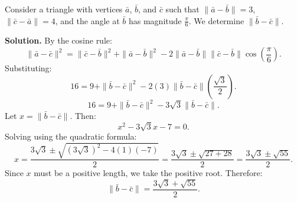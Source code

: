 \begin{examplebox}
Consider a triangle with vertices $\bar{a}$, $\bar{b}$, and $\bar{c}$ such that $\|\bar{a} - \bar{b}\| = 3$, $\|\bar{c} - \bar{a}\| = 4$, and the angle at $\bar{b}$ has magnitude $\frac{\pi}{6}$. We determine $\|\bar{b} - \bar{c}\|$.

\vspace{0.5em}
\textbf{Solution.} By the cosine rule:
\[
\|\bar{a} - \bar{c}\|^2 = \|\bar{c} - \bar{b}\|^2 + \|\bar{a} - \bar{b}\|^2 - 2\|\bar{a} - \bar{b}\|\|\bar{c} - \bar{b}\|\cos\left(\frac{\pi}{6}\right).
\]
Substituting:
\[
16 = 9 + \|\bar{b} - \bar{c}\|^2 - 2(3)\|\bar{b} - \bar{c}\|\left(\frac{\sqrt{3}}{2}\right).
\]
\[
16 = 9 + \|\bar{b} - \bar{c}\|^2 - 3\sqrt{3}\|\bar{b} - \bar{c}\|.
\]
Let $x = \|\bar{b} - \bar{c}\|$. Then:
\[
x^2 - 3\sqrt{3}x - 7 = 0.
\]
Solving using the quadratic formula:
\[
x = \frac{3\sqrt{3} \pm \sqrt{(3\sqrt{3})^2 - 4(1)(-7)}}{2} = \frac{3\sqrt{3} \pm \sqrt{27+28}}{2} = \frac{3\sqrt{3} \pm \sqrt{55}}{2}.
\]
Since $x$ must be a positive length, we take the positive root. Therefore:
\[
\|\bar{b} - \bar{c}\| = \frac{3\sqrt{3} + \sqrt{55}}{2}.
\]
\end{examplebox}



\newpage